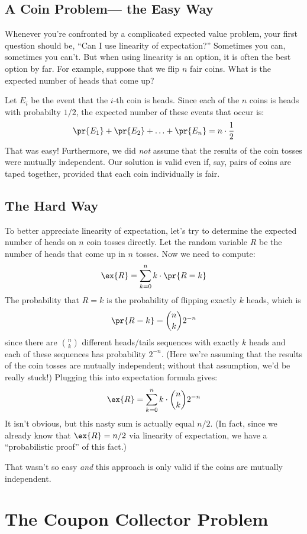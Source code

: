 \documentclass[12pt,twoside]{article}
\begin{document}
\subsection{A Coin Problem--- the Easy Way}

Whenever you're confronted by a complicated expected value problem,
your first question should be, ``Can I use linearity of expectation?''
Sometimes you can, sometimes you can't.  But when using linearity is
an option, it is often the best option by far.  For example, suppose
that we flip $n$ fair coins.  What is the expected number of heads
that come up?

Let $E_i$ be the event that the $i$-th coin is heads.  Since each of
the $n$ coins is heads with probabilty $1/2$, the expected number of
these events that occur is:
%
\[
\pr{E_1} + \pr{E_2} + \ldots + \pr{E_n} = n \cdot \frac{1}{2}
\]
%
That was easy!  Furthermore, we did \textit{not} assume that the
results of the coin tosses were mutually independent.  Our solution is
valid even if, say, pairs of coins are taped together, provided that
each coin individually is fair.

\subsection{The Hard Way}

To better appreciate linearity of expectation, let's try to determine
the expected number of heads on $n$ coin tosses directly.  Let the
random variable $R$ be the number of heads that come up in $n$ tosses.
Now we need to compute:
%
\[
\ex{R} = \sum_{k=0}^n k \cdot \pr{R = k}
\]
%
The probability that $R = k$ is the probability of flipping exactly
$k$ heads, which is
%
\[
\pr{R = k} = \binom{n}{k} 2^{-n}
\]
%
since there are $\binom{n}{k}$ different heads/tails sequences with
exactly $k$ heads and each of these sequences has probability
$2^{-n}$.  (Here we're assuming that the results of the coin tosses
are mutually independent; without that assumption, we'd be really
stuck!)  Plugging this into expectation formula gives:
%
\[
\ex{R} = \sum_{k=0}^n k \cdot \binom{n}{k} 2^{-n}
\]
%
It isn't obvious, but this nasty sum is actually equal $n/2$.  (In
fact, since we already know that $\ex{R} = n/2$ via linearity of
expectation, we have a ``probabilistic proof'' of this fact.)

That wasn't so easy \textit{and} this approach is only valid if the
coins are mutually independent.

\section{The Coupon Collector Problem}
\end{document}
